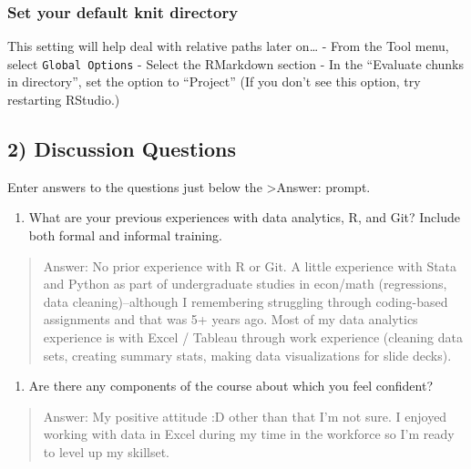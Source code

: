 \documentclass[
]{article}
\providecommand{\tightlist}{%
  \setlength{\itemsep}{0pt}\setlength{\parskip}{0pt}}
\begin{document}
\hypertarget{set-your-default-knit-directory}{%
\subsubsection{Set your default knit
directory}\label{set-your-default-knit-directory}}

This setting will help deal with relative paths later on\ldots{} - From
the Tool menu, select \texttt{Global\ Options} - Select the RMarkdown
section - In the ``Evaluate chunks in directory'', set the option to
``Project'' (If you don't see this option, try restarting RStudio.)

\hypertarget{discussion-questions}{%
\subsection{2) Discussion Questions}\label{discussion-questions}}

Enter answers to the questions just below the \textgreater Answer:
prompt.

\begin{enumerate}
\def\labelenumi{\arabic{enumi}.}
\tightlist
\item
  What are your previous experiences with data analytics, R, and Git?
  Include both formal and informal training.
\end{enumerate}

\begin{quote}
Answer: No prior experience with R or Git. A little experience with
Stata and Python as part of undergraduate studies in econ/math
(regressions, data cleaning)--although I remembering struggling through
coding-based assignments and that was 5+ years ago. Most of my data
analytics experience is with Excel / Tableau through work experience
(cleaning data sets, creating summary stats, making data visualizations
for slide decks).
\end{quote}

\begin{enumerate}
\def\labelenumi{\arabic{enumi}.}
\setcounter{enumi}{1}
\tightlist
\item
  Are there any components of the course about which you feel confident?
\end{enumerate}

\begin{quote}
Answer: My positive attitude :D other than that I'm not sure. I enjoyed
working with data in Excel during my time in the workforce so I'm ready
to level up my skillset.
\end{quote}
\end{document}

